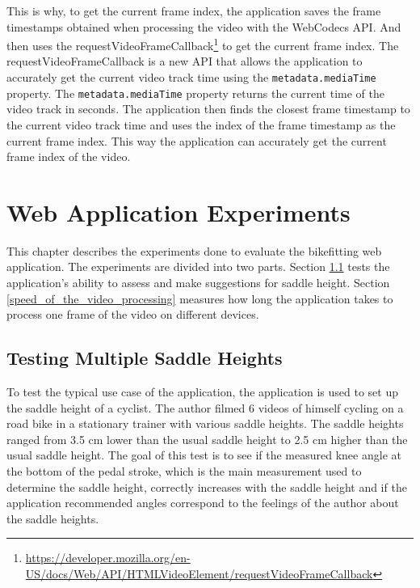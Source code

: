 This is why, to get the current frame index, the application saves the frame timestamps obtained when processing the video with the WebCodecs API. And then uses the requestVideoFrameCallback\footnote{\url{https://developer.mozilla.org/en-US/docs/Web/API/HTMLVideoElement/requestVideoFrameCallback}} to get the current frame index. The requestVideoFrameCallback is a new API that allows the application to accurately get the current video track time using the \texttt{metadata.mediaTime} property. The \texttt{metadata.mediaTime} property returns the current time of the video track in seconds. The application then finds the closest frame timestamp to the current video track time and uses the index of the frame timestamp as the current frame index. This way the application can accurately get the current frame index of the video.




\chapter{Web Application Experiments}
\label{experiments}

This chapter describes the experiments done to evaluate the bikefitting web application. The experiments are divided into two parts. Section \ref{assesment_of_multiple_saddle_heights} tests the application's ability to assess and make suggestions for saddle height. Section \ref{speed_of_the_video_processing} measures how long the application takes to process one frame of the video on different devices.

\section{Testing Multiple Saddle Heights}
\label{assesment_of_multiple_saddle_heights}
To test the typical use case of the application, the application is used to set up the saddle height of a cyclist. The author filmed 6 videos of himself cycling on a road bike in a stationary trainer with various saddle heights. The saddle heights ranged from 3.5 cm lower than the usual saddle height to 2.5 cm higher than the usual saddle height. The goal of this test is to see if the measured knee angle at the bottom of the pedal stroke, which is the main measurement used to determine the saddle height, correctly increases with the saddle height and if the application recommended angles correspond to the feelings of the author about the saddle heights.

